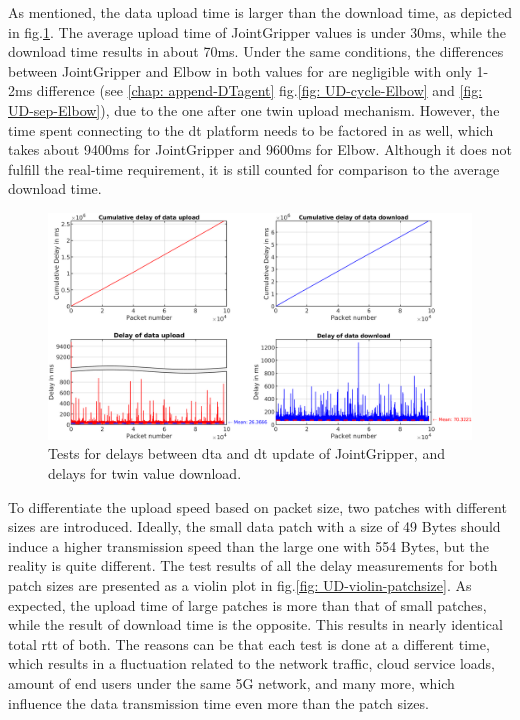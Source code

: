As mentioned, the data upload time is larger than the download time, as depicted in 
fig.\ref{fig: UD-sep-JointGripper}. The average upload time of JointGripper values is under 30ms, 
while the download time results in about 70ms. Under the same conditions, the differences 
between JointGripper and Elbow in both values for are negligible with only 1-2ms difference (see \ref{chap: append-DTagent} fig.\ref{fig: UD-cycle-Elbow} 
and \ref{fig: UD-sep-Elbow}), due to the one after one twin upload mechanism. However, 
the time spent connecting to the \gls{dt} platform needs to be factored in 
as well, which takes about 9400ms for JointGripper and 9600ms for Elbow. Although it 
does not fulfill the real-time requirement, it is still counted for comparison 
to the average download time.




\begin{figure}[htb]
    \includegraphics[width=\textwidth]{figures/tests/DT/Delay_UploadDownload_JointGripper.png}
    \centering
    \caption{Tests for delays between \gls{dta} and \gls{dt} update of JointGripper, 
    and delays for twin value download. \label{fig: UD-sep-JointGripper}}
\end{figure}


To differentiate the upload speed based on packet size, two patches with 
different sizes are introduced. Ideally, the small data patch with a size of 
49 Bytes should induce a higher transmission speed than the large one with 554 Bytes, 
but the reality is quite different. The test results of all the 
delay measurements for both patch sizes are presented as a violin plot in 
fig.\ref{fig: UD-violin-patchsize}. As expected, the upload time of large 
patches is more than that of small patches, while the result of download time is 
the opposite. This results in nearly identical total \gls{rtt} of both. 
The reasons can be that each test is done at a different time, which results in a 
fluctuation related to the network traffic, cloud service loads, amount of end users 
under the same 5G network, and many more, which influence the data transmission time 
even more than the patch sizes.

